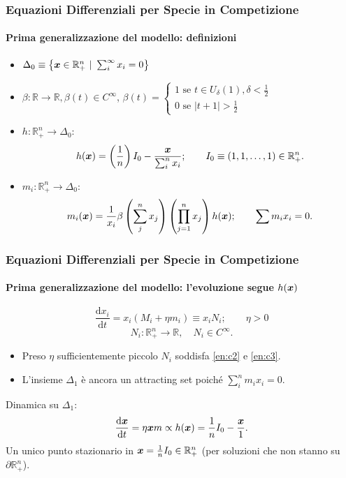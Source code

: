 \begin{frame}
\frametitle{Equazioni Differenziali per Specie in Competizione}
\framesubtitle{Prima generalizzazione del modello: definizioni}
\begin{itemize}
    \item $\Delta_0 \equiv \left\{\boldsymbol{x}\in \mathbb{R}^n_+ \ | \ \sum_{i}^{\infty} x_i = 0\right\}$
    \item $\beta : \mathbb{R}\to \mathbb{R}, \beta(t) \in C^{\infty}$,
	    $\beta (t) = 
            \begin{cases}
	    1 \text{ se } t \in U_{\delta}(1), \delta<\frac{1}{2} \\
		0 \text{ se } \left|t + 1\right| > \frac{1}{2}
            \end{cases}$
    \item $h: \mathbb{R}^n_+ \to \Delta_0$:
	\[
	    h(\boldsymbol{x}) = \left(\frac{1}{n}\right)I_0- \frac{\boldsymbol{x}}{\sum_{i}^{n} x_i}; \qquad
	    I_0 \equiv \left(1, 1, \ldots, 1\right) \in \mathbb{R}^n_+
	.\] 
    \item $m_i:\mathbb{R}^n_+ \to \Delta_0$:
	\[
	     m_i(\boldsymbol{x}) = \frac{1}{x_i}\beta\left(\sum_{j}^{n} x_j\right) \left(\prod_{j=1}^{n} x_j \right)h(\boldsymbol{x}); \qquad \sum m_i x_i = 0
	.\] 
\end{itemize}
\end{frame}

\begin{frame}
\frametitle{Equazioni Differenziali per Specie in Competizione}
\framesubtitle{Prima generalizzazione del modello: l'evoluzione segue $h(\boldsymbol{x})$}
\begin{equation}
    \frac{\text{d} x_i}{\text{d} t} = x_i\left(M_i + \eta m_i\right) \equiv x_i N_i; \qquad  \eta > 0
    \label{eq:smale2}
\end{equation}
\[
    N_i: \mathbb{R}^n_+ \to \mathbb{R}, \quad N_i \in C^{\infty}
.\] 
\begin{itemize}
    \item Preso $\eta$ sufficientemente piccolo $N_i$ soddisfa \ref{en:c2} e \ref{en:c3}.
    \item L'insieme $\Delta_1$ è ancora un attracting set poiché $\sum_{i}^{n} m_ix_i = 0$. 
\end{itemize}
Dinamica su $\Delta_1$:
\[
    \frac{\text{d} \boldsymbol{x}}{\text{d} t} = \eta  \boldsymbol{x} m \propto h(\boldsymbol{x})  = \frac{1}{n}I_0 - \frac{\boldsymbol{x}}{1}
.\] 
Un unico punto stazionario in $\boldsymbol{x} = \frac{1}{n}I_0 \in \mathbb{R}^n_+$ (per soluzioni che non stanno su $\partial \mathbb{R}^n_+$).
\end{frame}

